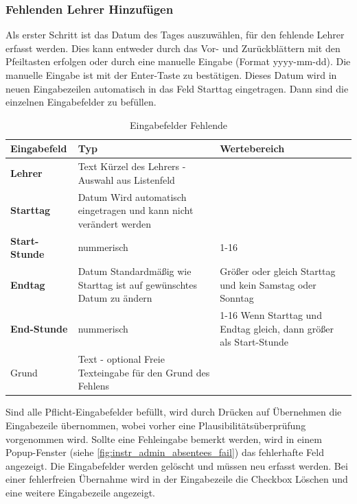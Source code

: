 \subsubsection{Fehlenden Lehrer Hinzufügen} \label{sec:instr_admin_absentees_teacher_insert}
Als erster Schritt ist das Datum des Tages auszuwählen, für den fehlende Lehrer erfasst werden. Dies kann entweder durch das Vor- und Zurückblättern mit den Pfeiltasten erfolgen oder durch eine manuelle Eingabe (Format yyyy-mm-dd). Die manuelle Eingabe ist mit der Enter-Taste zu bestätigen. Dieses Datum wird in neuen Eingabezeilen automatisch in das Feld Starttag eingetragen. Dann sind die einzelnen Eingabefelder zu befüllen.\\
\begin{table}
\centering
\begin{tabular}{p{3 cm}p{6 cm}p{5 cm}}
   \toprule
   \textbf{Eingabefeld} & \textbf{Typ} & \textbf{Wertebereich} \\
   \midrule
          \textbf{Lehrer} & Text \newline Kürzel des Lehrers -Auswahl aus Listenfeld & \\
          \hline
          \textbf{Starttag} & Datum \newline Wird automatisch eingetragen und kann nicht verändert werden &  \\
          \hline
          \textbf{Start-Stunde} & nummerisch & 1-16\\
          \hline
          \textbf{Endtag} & Datum \newline Standardmäßig wie Starttag ist auf gewünschtes Datum zu ändern & Größer oder gleich Starttag und kein Samstag oder Sonntag \\
          \hline
          \textbf{End-Stunde} & nummerisch & 1-16 \newline Wenn Starttag und Endtag gleich, dann größer als Start-Stunde\\
          \hline
          Grund & Text - optional \newline Freie Texteingabe für den Grund des Fehlens & \\
   \bottomrule
\end{tabular}
\caption{Eingabefelder Fehlende}
\end{table}
Sind alle Pflicht-Eingabefelder befüllt, wird durch Drücken auf Übernehmen die Eingabezeile übernommen, wobei vorher eine Plausibilitätsüberprüfung vorgenommen wird. Sollte eine Fehleingabe bemerkt werden, wird in einem Popup-Fenster (siehe \autoref{fig:instr_admin_absentees_fail}) das fehlerhafte Feld angezeigt. Die Eingabefelder werden gelöscht und müssen neu erfasst werden. Bei einer fehlerfreien Übernahme wird in der Eingabezeile die Checkbox Löschen und eine weitere Eingabezeile angezeigt.
